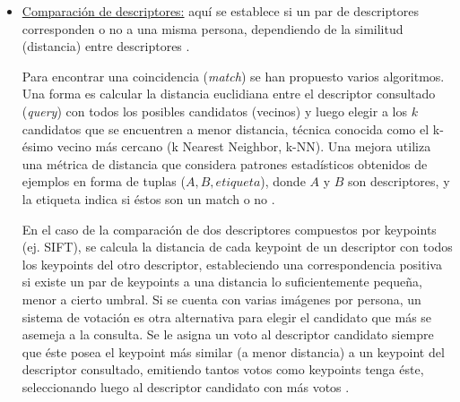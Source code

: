 \documentclass[../memoria.tex]{subfiles}
\begin{document}
\begin{itemize}
	\item \underline{Comparación de descriptores:} aquí se establece si un par de descriptores corresponden o no a una misma persona, dependiendo de la similitud (distancia) entre descriptores \cite{gheissari2006person, wang2007shape, farenzena2010person, gray2008viewpoint, bak2010person, lin2008learning, prosser2010person, dalal2005histograms}.

	\indent Para encontrar una coincidencia (\emph{match}) se han propuesto varios algoritmos. Una forma es calcular la distancia euclidiana entre el descriptor consultado (\emph{query}) con todos los posibles candidatos (vecinos) y luego elegir a los $k$ candidatos que se encuentren a menor distancia, técnica conocida como el k-ésimo vecino más cercano (k Nearest Neighbor, k-NN). Una mejora utiliza una métrica de distancia que considera patrones estadísticos obtenidos de ejemplos en forma de tuplas ($A,B,etiqueta$), donde $A$ y $B$ son descriptores, y la etiqueta indica si éstos son un match o no \cite{weinberger2009dml, zheng2013reidentification, dikmen2011pedestrian, hirzer2012person, hirzer2012relaxed, zheng2011person}.

	\indent En el caso de la comparación de dos descriptores compuestos por keypoints (ej. SIFT), se calcula la distancia de cada keypoint de un descriptor con todos los keypoints del otro descriptor, estableciendo una correspondencia positiva si existe un par de keypoints a una distancia lo suficientemente pequeña, menor a cierto umbral. Si se cuenta con varias imágenes por persona, un sistema de votación es otra alternativa para elegir el candidato que más se asemeja a la consulta. Se le asigna un voto al descriptor candidato siempre que éste posea el keypoint más similar (a menor distancia) a un keypoint del descriptor consultado, emitiendo tantos votos como keypoints tenga éste, seleccionando luego al descriptor candidato con más votos \cite{hamdoun2008person}. 
	\end{itemize}
\end{document}
